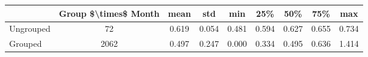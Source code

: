 \begin{tabular}{lcccccccc}
\toprule
{} &  Group \$\textbackslash times\$ Month &   mean &    std &    min &    25\% &    50\% &    75\% &    max \\
\midrule
Ungrouped &                    72 &  0.619 &  0.054 &  0.481 &  0.594 &  0.627 &  0.655 &  0.734 \\
Grouped   &                  2062 &  0.497 &  0.247 &  0.000 &  0.334 &  0.495 &  0.636 &  1.414 \\
\bottomrule
\end{tabular}
